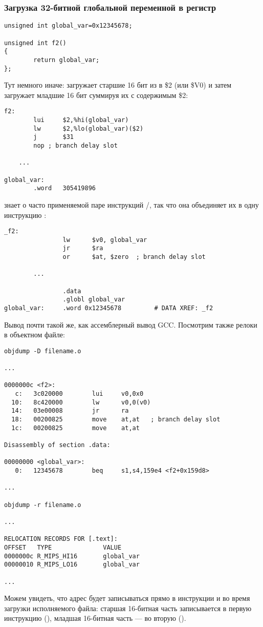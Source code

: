 \subsubsection{Загрузка 32-битной глобальной переменной в регистр}

\begin{lstlisting}[style=customc]
unsigned int global_var=0x12345678;

unsigned int f2()
{
        return global_var;
};
\end{lstlisting}


Тут немного иначе:  загружает старшие 16 бит из  в \$2 (или \$V0) и затем  загружает младшие
16 бит суммируя их с содержимым \$2:

\begin{lstlisting}[caption=GCC 4.4.5 -O3 (\assemblyOutput),style=customasmMIPS]
f2:
        lui     $2,%hi(global_var)
        lw      $2,%lo(global_var)($2)
        j       $31
        nop	; branch delay slot

	...

global_var:
        .word   305419896
\end{lstlisting}

\IDA знает о часто применяемой паре инструкций /, так что она объединяет их в одну инструкцию :

\begin{lstlisting}[caption=GCC 4.4.5 -O3 (IDA),style=customasmMIPS]
_f2:
                lw      $v0, global_var
                jr      $ra
                or      $at, $zero	; branch delay slot

		...

                .data
                .globl global_var
global_var:     .word 0x12345678         # DATA XREF: _f2
\end{lstlisting}

Вывод  почти такой же, как ассемблерный вывод GCC.
Посмотрим также релоки в объектном файле:

\begin{lstlisting}[caption=objdump,style=customasmMIPS]
objdump -D filename.o

...

0000000c <f2>:
   c:   3c020000        lui     v0,0x0
  10:   8c420000        lw      v0,0(v0)
  14:   03e00008        jr      ra
  18:   00200825        move    at,at	; branch delay slot
  1c:   00200825        move    at,at

Disassembly of section .data:

00000000 <global_var>:
   0:   12345678        beq     s1,s4,159e4 <f2+0x159d8>

...

objdump -r filename.o

...

RELOCATION RECORDS FOR [.text]:
OFFSET   TYPE              VALUE
0000000c R_MIPS_HI16       global_var
00000010 R_MIPS_LO16       global_var

...

\end{lstlisting}

Можем увидеть, что адрес  будет записываться прямо в инструкции  и  во время загрузки исполняемого
файла:
старшая 16-битная часть  записывается в первую инструкцию (), младшая 16-битная часть ---
во вторую ().

